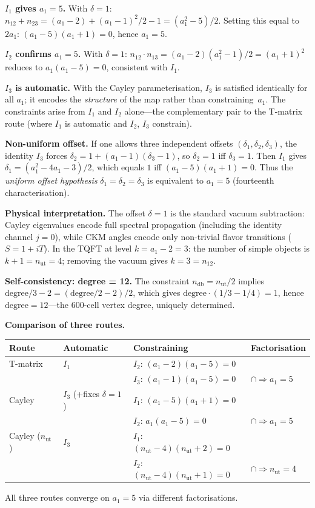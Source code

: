 \documentclass[12pt,a4paper]{article}
\theoremstyle{definition}
\begin{document}
\textbf{$I_1$ gives $a_1 = 5$.}  With $\delta = 1$: $n_{12} + n_{23} = (a_1-2) + (a_1-1)^2/2 - 1 = (a_1^2 - 5)/2$.  Setting this equal to $2a_1$: $(a_1-5)(a_1+1) = 0$, hence $a_1 = 5$.

\textbf{$I_2$ confirms $a_1 = 5$.}  With $\delta = 1$: $n_{12} \cdot n_{13} = (a_1-2)(a_1^2-1)/2 = (a_1+1)^2$ reduces to $a_1(a_1-5) = 0$, consistent with $I_1$.

\textbf{$I_3$ is automatic.}  With the Cayley parameterisation, $I_3$ is satisfied identically for all $a_1$; it encodes the \emph{structure} of the map rather than constraining~$a_1$.  The constraints arise from $I_1$ and $I_2$ alone---the complementary pair to the T-matrix route (where $I_1$ is automatic and $I_2$, $I_3$ constrain).

\textbf{Non-uniform offset.}  If one allows three independent offsets $(\delta_1, \delta_2, \delta_3)$, the identity $I_3$ forces $\delta_2 = 1 + (a_1-1)(\delta_3-1)$, so $\delta_2 = 1$ iff $\delta_3 = 1$.  Then $I_1$ gives $\delta_1 = (a_1^2 - 4a_1 - 3)/2$, which equals $1$ iff $(a_1-5)(a_1+1) = 0$.  Thus the \emph{uniform offset hypothesis} $\delta_1 = \delta_2 = \delta_3$ is equivalent to $a_1 = 5$ (fourteenth characterisation).

\textbf{Physical interpretation.}  The offset $\delta = 1$ is the standard vacuum subtraction: Cayley eigenvalues encode full spectral propagation (including the identity channel $j = 0$), while CKM angles encode only non-trivial flavor transitions ($S = 1 + iT$).  In the TQFT at level $k = a_1 - 2 = 3$: the number of simple objects is $k + 1 = n_{\text{ut}} = 4$; removing the vacuum gives $k = 3 = n_{12}$.

\textbf{Self-consistency: degree = 12.}  The constraint $n_{\text{db}} = n_{\text{ut}}/2$ implies $\text{degree}/3 - 2 = (\text{degree}/2 - 2)/2$, which gives $\text{degree} \cdot (1/3 - 1/4) = 1$, hence $\text{degree} = 12$---the 600-cell vertex degree, uniquely determined.

\textbf{Comparison of three routes.}
\begin{center}
\begin{tabular}{llll}
\toprule
\textbf{Route} & \textbf{Automatic} & \textbf{Constraining} & \textbf{Factorisation} \\
\midrule
T-matrix & $I_1$ & $I_2$: $(a_1-2)(a_1-5)=0$ & \\
         &       & $I_3$: $(a_1-1)(a_1-5)=0$ & $\cap \Rightarrow a_1=5$ \\
Cayley   & $I_3$ (+fixes $\delta=1$) & $I_1$: $(a_1-5)(a_1+1)=0$ & \\
         &       & $I_2$: $a_1(a_1-5)=0$ & $\cap \Rightarrow a_1=5$ \\
Cayley ($n_{\text{ut}}$) & $I_3$ & $I_1$: $(n_{\text{ut}}-4)(n_{\text{ut}}+2)=0$ & \\
         &       & $I_2$: $(n_{\text{ut}}-4)(n_{\text{ut}}+1)=0$ & $\cap \Rightarrow n_{\text{ut}}=4$ \\
\bottomrule
\end{tabular}
\end{center}
All three routes converge on $a_1 = 5$ via different factorisations.
\end{document}
